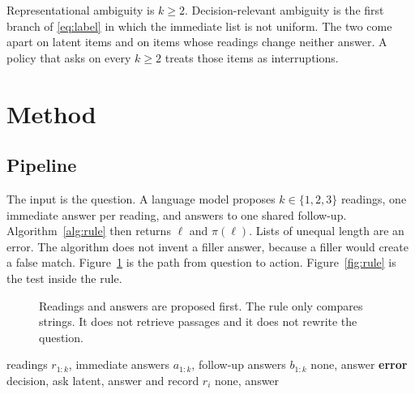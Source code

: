 \documentclass[journal]{IEEEtran}
\begin{document}
Representational ambiguity is $k \ge 2$.
Decision-relevant ambiguity is the first branch of \eqref{eq:label} in which the immediate list is not uniform.
The two come apart on latent items and on items whose readings change neither answer.
A policy that asks on every $k \ge 2$ treats those items as interruptions.

\section{Method}
\label{sec:method}

\subsection{Pipeline}
The input is the question.
A language model proposes $k \in \{1,2,3\}$ readings, one immediate answer per reading, and answers to one shared follow-up.
Algorithm~\ref{alg:rule} then returns $\ell$ and $\pi(\ell)$.
Lists of unequal length are an error.
The algorithm does not invent a filler answer, because a filler would create a false match.
Figure~\ref{fig:pipe} is the path from question to action.
Figure~\ref{fig:rule} is the test inside the rule.

\begin{figure}[!t]
\centering
{}
\caption{Readings and answers are proposed first. The rule only compares strings. It does not retrieve passages and it does not rewrite the question.}
\label{fig:pipe}
\end{figure}

\begin{algorithm}[!t]
\caption{Label and action from the answer lists. The AmbigQA type is not an argument.}
\label{alg:rule}
\begin{algorithmic}[1]
\Require readings $r_{1:k}$, immediate answers $a_{1:k}$, follow-up answers $b_{1:k}$
  \State \Return none, answer
\EndIf
{}
  \State \textbf{error}
\EndIf
{}
  \State \Return decision, ask
\EndIf
{}
  \State \Return latent, answer and record $r_i$
\EndIf
\State \Return none, answer
\end{algorithmic}
\end{algorithm}
\end{document}

